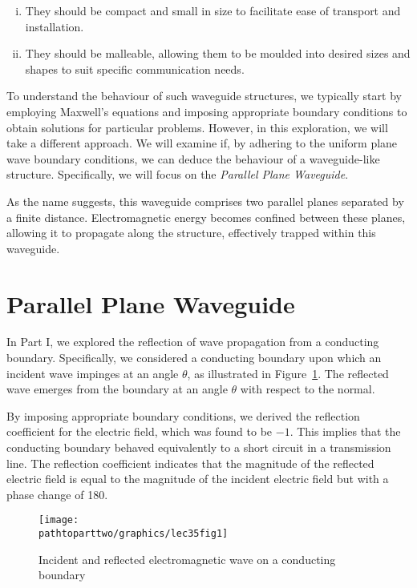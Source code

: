 \begin{enumerate}[(i)]
\item They should be compact and small in size to facilitate ease of transport and installation.
\item They should be malleable, allowing them to be moulded into desired sizes and shapes to suit specific communication needs.
\end{enumerate}

To understand the behaviour of such waveguide structures, we typically start by employing Maxwell's equations and imposing appropriate boundary conditions to obtain solutions for particular problems. However, in this exploration, we will take a different approach. We will examine if, by adhering to the uniform plane wave boundary conditions, we can deduce the behaviour of a waveguide-like structure. Specifically, we will focus on the \emph{Parallel Plane Waveguide}.

As the name suggests, this waveguide comprises two parallel planes separated by a finite distance. Electromagnetic energy becomes confined between these planes, allowing it to propagate along the structure, effectively trapped within this waveguide.

\section{Parallel Plane Waveguide}
In Part I, we explored the reflection of wave propagation from a conducting boundary. Specifically, we considered a conducting boundary upon which an incident wave impinges at an angle $\theta$, as illustrated in Figure~\ref{fig:lec35fig1}. The reflected wave emerges from the boundary at an angle $\theta$ with respect to the normal.

By imposing appropriate boundary conditions, we derived the reflection coefficient for the electric field, which was found to be $-1$. This implies that the conducting boundary behaved equivalently to a short circuit in a transmission line. The reflection coefficient indicates that the magnitude of the reflected electric field is equal to the magnitude of the incident electric field but with a phase change of 180\textdegree.
\begin{figure}[h]
\centering
\texttt{[image: \\pathtoparttwo/graphics/lec35fig1]}
\caption{Incident and reflected electromagnetic wave on a conducting boundary}
\label{fig:lec35fig1}
\end{figure}


